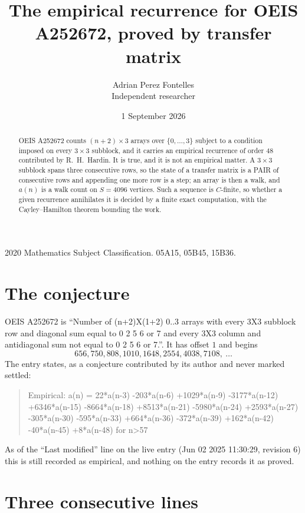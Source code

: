 \documentclass[11pt,a4paper]{article}
\title{The empirical recurrence for OEIS A252672, proved by transfer matrix}
\author{Adrian Perez Fontelles\\ \small Independent researcher}
\date{1 September 2026}
\theoremstyle{plain}
\theoremstyle{definition}
\begin{document}
\maketitle

\begin{abstract}
OEIS A252672 counts $(n+2)\times3$ arrays over $\{0,\dots,3\}$ subject to a condition imposed on
every $3\times3$ subblock, and it carries an empirical recurrence of order $48$
contributed by R.~H.~Hardin. It is true, and it is not an empirical matter. A $3\times3$
subblock spans three consecutive rows, so the state of a transfer matrix is a PAIR of
consecutive rows and appending one more row is a step; an array is then a walk, and
$a(n)$ is a walk count on $S=4096$ vertices. Such a sequence is $C$-finite, so whether a given
recurrence annihilates it is decided by a finite exact computation, with the Cayley--Hamilton
theorem bounding the work.
\end{abstract}

\noindent\small 2020 Mathematics Subject Classification. 05A15, 05B45, 15B36.\normalsize

\section{The conjecture}

OEIS A252672 is ``Number of (n+2)X(1+2) 0..3 arrays with every 3X3 subblock row and diagonal sum equal to 0 2 5 6 or 7 and every 3X3 column and antidiagonal sum not equal to 0 2 5 6 or 7.''. It has offset $1$ and begins
\[
656, 750, 808, 1010, 1648, 2554, 4038, 7108,\ \dots
\]
The entry states, as a conjecture contributed by its author and never marked settled:
\begin{quote}
Empirical: a(n) = 22*a(n-3) -203*a(n-6) +1029*a(n-9) -3177*a(n-12) +6346*a(n-15) -8664*a(n-18) +8513*a(n-21) -5980*a(n-24) +2593*a(n-27) -305*a(n-30) -595*a(n-33) +664*a(n-36) -372*a(n-39) +162*a(n-42) -40*a(n-45) +8*a(n-48) for n>57
\end{quote}
As of the ``Last modified'' line on the live entry (Jun 02 2025 11:30:29, revision 6) this is still
recorded as empirical, and nothing on the entry records it as proved.

\section{Three consecutive lines}
\end{document}
